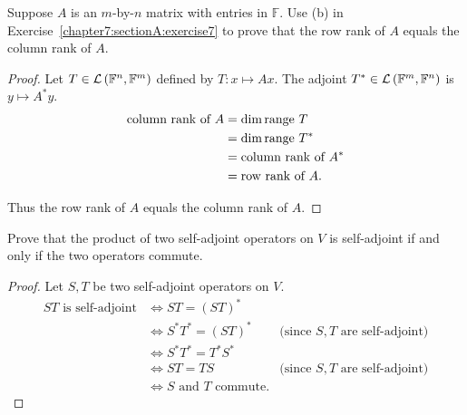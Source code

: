 \begin{exercise}
    Suppose $A$ is an $m$-by-$n$ matrix with entries in $\mathbb{F}$. Use (b) in Exercise~\ref{chapter7:sectionA:exercise7} to prove that the row rank of $A$ equals the column rank of $A$.
\end{exercise}

\begin{proof}
    Let $T\in \mathcal{L}\left({\mathbb{F}^{n}, \mathbb{F}^{m}}\right)$ defined by $T: x\mapsto Ax$. The adjoint $T^{*}\in \mathcal{L}\left({\mathbb{F}^{m}, \mathbb{F}^{n}}\right)$ is $y\mapsto A^{*}y$.
    \begin{align*}
        \text{column rank of $A$} & = \dim\operatorname{range}\,{T}                 \\
                                  & = \dim\operatorname{range}\,{T^{*}}             \\
                                  & = \text{column rank of $A^{*}$} \\
                                  & = \text{row rank of $A$}.
    \end{align*}

    Thus the row rank of $A$ equals the column rank of $A$.
\end{proof}
\newpage

\begin{exercise}
    Prove that the product of two self-adjoint operators on $V$ is self-adjoint if and only if the two operators commute.
\end{exercise}

\begin{proof}
    Let $S, T$ be two self-adjoint operators on $V$.
    \begin{align*}
        \text{$ST$ is self-adjoint} & \Longleftrightarrow ST = {(ST)}^{*}                                                      \\
                                    & \Longleftrightarrow S^{*}T^{*} = {(ST)}^{*}     & \text{(since $S, T$ are self-adjoint)} \\
                                    & \Longleftrightarrow S^{*}T^{*} = T^{*}S^{*}                                              \\
                                    & \Longleftrightarrow ST = TS                     & \text{(since $S, T$ are self-adjoint)} \\
                                    & \Longleftrightarrow \text{$S$ and $T$ commute.}
    \end{align*}
\end{proof}
\newpage

